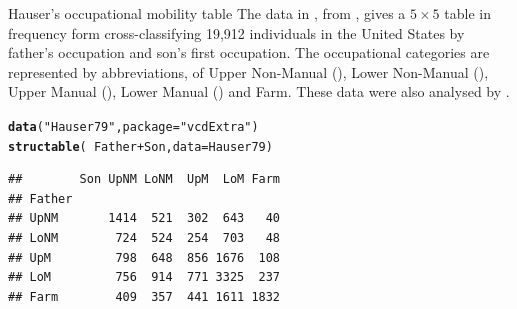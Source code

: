 \documentclass[11pt]{book}\usepackage[]{graphicx}\usepackage[]{color}
\makeatletter
\newcommand{\hlstr}[1]{\textcolor[rgb]{0.192,0.494,0.8}{#1}}%
\newcommand{\hlopt}[1]{\textcolor[rgb]{0,0,0}{#1}}%
\newcommand{\hlstd}[1]{\textcolor[rgb]{0.345,0.345,0.345}{#1}}%
\newcommand{\hlkwc}[1]{\textcolor[rgb]{0.333,0.667,0.333}{#1}}%
\newcommand{\hlkwd}[1]{\textcolor[rgb]{0.737,0.353,0.396}{\textbf{#1}}}%
\newenvironment{kframe}{%
 \def\at@end@of@kframe{}%
 \ifinner\ifhmode%
  \def\at@end@of@kframe{\end{minipage}}%
  \begin{minipage}{\columnwidth}%
 \fi\fi%
 \def\FrameCommand##1{\hskip\@totalleftmargin \hskip-\fboxsep
 \colorbox{shadecolor}{##1}\hskip-\fboxsep
     \hskip-\linewidth \hskip-\@totalleftmargin \hskip\columnwidth}%
 \MakeFramed {\advance\hsize-\width
   \@totalleftmargin\z@ \linewidth\hsize
   \@setminipage}}%
 {\par\unskip\endMakeFramed%
 \at@end@of@kframe}
\newenvironment{knitrout}{}{} %
\renewenvironment{knitrout}{\small\renewcommand{\baselinestretch}{.85}}{} %
\makeatother
\begin{document}
\begin{Example}[hauser1]{Hauser's occupational mobility table}
The data  in , from \citet{Hauser:79},
gives a $5 \times 5$ table in frequency form
cross-classifying 19,912 individuals in the United States
by father's occupation and son's first occupation.
The occupational categories are represented by abbreviations,
of Upper Non-Manual (), Lower Non-Manual (), Upper Manual (),
Lower Manual ()
and Farm.  These data were also analysed by \citet{PowersXie:2008}.

\begin{knitrout}
\color{fgcolor}\begin{kframe}
\begin{alltt}
\hlkwd{data}\hlstd{(}\hlstr{"Hauser79"}\hlstd{,} \hlkwc{package}\hlstd{=}\hlstr{"vcdExtra"}\hlstd{)}
\hlkwd{structable}\hlstd{(}\hlopt{~}\hlstd{Father}\hlopt{+}\hlstd{Son,} \hlkwc{data}\hlstd{=Hauser79)}
\end{alltt}
\begin{verbatim}
##        Son UpNM LoNM  UpM  LoM Farm
## Father                             
## UpNM       1414  521  302  643   40
## LoNM        724  524  254  703   48
## UpM         798  648  856 1676  108
## LoM         756  914  771 3325  237
## Farm        409  357  441 1611 1832
\end{verbatim}
\end{kframe}
\end{knitrout}


\end{Example}
\end{document}
